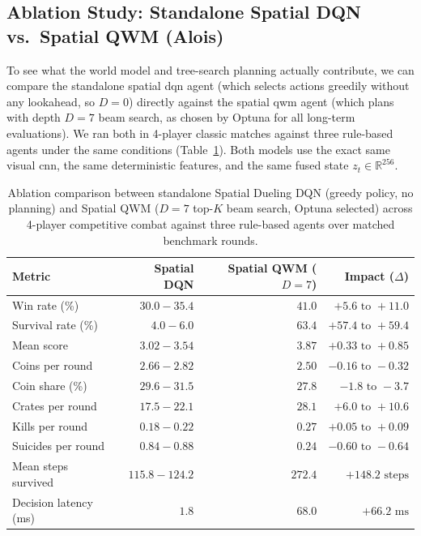 \documentclass[article, 10pt]{IEEEtran}
\begin{document}
\subsection{Ablation Study: Standalone Spatial DQN vs.\ Spatial QWM (Alois)}\label{subsec:spatial_dqn_ablation}

To see what the world model and tree-search planning actually contribute, we can compare the standalone spatial dqn agent (which selects actions greedily without any lookahead, so $D=0$) directly against the spatial qwm agent (which plans with depth $D=7$ beam search, as chosen by Optuna for all long-term evaluations). We ran both in 4-player classic matches against three rule-based agents under the same conditions (Table~\ref{tab:dqn_vs_qwm_ablation}). Both models use the exact same visual cnn, the same deterministic features, and the same fused state $z_t \in \mathbb{R}^{256}$.

\begin{table}[t]
  \centering
  \small
  \caption{Ablation comparison between standalone Spatial Dueling DQN (greedy policy, no planning) and Spatial QWM ($D=7$ top-$K$ beam search, Optuna selected) across 4-player competitive combat against three rule-based agents over matched benchmark rounds.}
  \label{tab:dqn_vs_qwm_ablation}
  \begin{tabular}{lrrr}
    \toprule
    Metric & Spatial DQN & Spatial QWM ($D=7$) & Impact ($\Delta$) \\
    \midrule
    Win rate (\%)           & $30.0 - 35.4$ & $41.0$ & $+5.6\text{ to }+11.0$ \\
    Survival rate (\%)      & $4.0 - 6.0$   & $63.4$ & $+57.4\text{ to }+59.4$ \\
    Mean score              & $3.02 - 3.54$ & $3.87$ & $+0.33\text{ to }+0.85$ \\
    Coins per round         & $2.66 - 2.82$ & $2.50$ & $-0.16\text{ to }-0.32$ \\
    Coin share (\%)         & $29.6 - 31.5$ & $27.8$ & $-1.8\text{ to }-3.7$ \\
    Crates per round        & $17.5 - 22.1$ & $28.1$ & $+6.0\text{ to }+10.6$ \\
    Kills per round         & $0.18 - 0.22$ & $0.27$ & $+0.05\text{ to }+0.09$ \\
    Suicides per round      & $0.84 - 0.88$ & $0.24$ & $-0.60\text{ to }-0.64$ \\
    Mean steps survived     & $115.8 - 124.2$ & $272.4$ & $+148.2\text{ steps}$ \\
    Decision latency (ms)   & $1.8$         & $68.0$ & $+66.2\text{ ms}$ \\
    \bottomrule
  \end{tabular}
\end{table}
\end{document}

